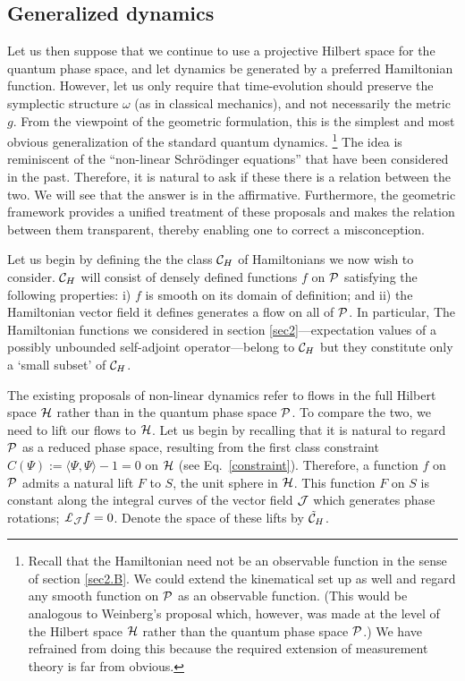 \documentclass[12pt,aps,eqsecnum,tighten,nofootinbib]{revtex4-2}
\def\<{\langle}
\def\>{\rangle}
\def\H{{\cal H}}
\def\P{{\cal P}}
\def\J{{\cal J}}
\newcommand{\lie}[1]{{\pounds}_{#1}}
\def\ch{{\cal C}_H}
\begin{document}
\subsection{Generalized dynamics} \label{sec3.A}

Let us then suppose that we continue to use a projective Hilbert space
for the quantum phase space, and let dynamics be generated by a
preferred Hamiltonian function. However, let us only require that
time-evolution should preserve the symplectic structure $\omega$ (as
in classical mechanics), and not necessarily the metric $g$. {}From
the viewpoint of the geometric formulation, this is the simplest and
most obvious generalization of the standard quantum dynamics.%
%
\footnote{Recall that the Hamiltonian need not be an observable
function in the sense of section \ref{sec2.B}. We could extend the
kinematical set up as well and regard any smooth function on $\P$ as
an observable function.  (This would be analogous to Weinberg's
\cite{weinberg} proposal which, however, was made at the level of the
Hilbert space $\H$ rather than the quantum phase space $\P$.) We have
refrained from doing this because the required extension of
measurement theory is far from obvious.}  
% 
The idea is reminiscent of the ``non-linear Schr\"odinger equations''
that have been considered in the past. Therefore, it is
natural to ask if these there is a relation between the two.  We will
see that the answer is in the affirmative. Furthermore, the geometric
framework provides a unified treatment of these proposals and makes
the relation between them transparent, thereby enabling one to correct
a misconception.

Let us begin by defining the the class $\ch$ of Hamiltonians we now
wish to consider. $\ch$ will consist of densely defined functions $f$
on $\P$ satisfying the following properties: i) $f$ is smooth on its
domain of definition; and ii) the Hamiltonian vector field it defines
generates a flow on all of $\P$.  In particular, The Hamiltonian
functions we considered in section \ref{sec2}---expectation values of
a possibly unbounded self-adjoint operator---belong to $\ch$ but they
constitute only a `small subset' of $\ch$.

The existing proposals of non-linear dynamics refer to flows in the
full Hilbert space $\H$ rather than in the quantum phase space $\P$.
To compare the two, we need to lift our flows to $\H$.  Let us begin
by recalling that it is natural to regard $\P$ as a reduced phase
space, resulting from the first class constraint $ C(\Psi) := \< \Psi,
\Psi\> -1 =0$ on $\H$ (see Eq.~\ref{constraint}).  Therefore, a
function $f$ on $\P$ admits a natural lift $F$ to $S$, the unit sphere
in $\H$. This function $F$ on $S$ is constant along the integral
curves of the vector field $\J$ which generates phase rotations;
$\lie{\J}f = 0$. Denote the space of these lifts by $\tilde\ch$.
\end{document}
